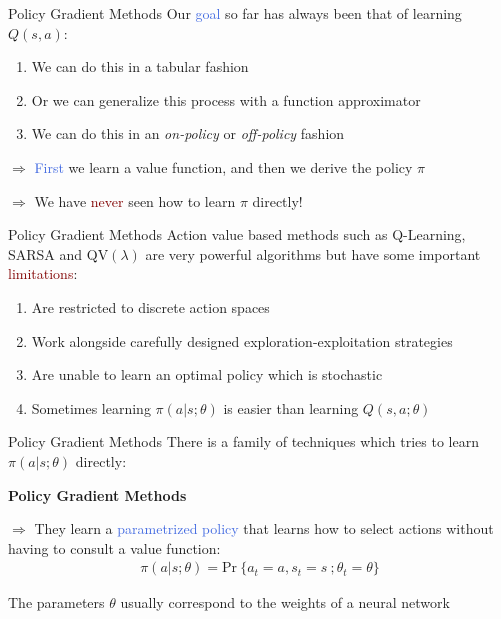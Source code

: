 \documentclass{beamer}
\begin{document}
\begin{frame}{Policy Gradient Methods}
	Our \textcolor{RoyalBlue}{goal} so far has always been that of learning $Q(s,a)$:
	\begin{enumerate}
		\item We can do this in a tabular fashion 
		\item Or we can generalize this process with a function approximator
		\item We can do this in an \textit{on-policy} or \textit{off-policy} fashion
	\end{enumerate}

	\bigskip

	$\Rightarrow$ \textcolor{RoyalBlue}{First} we learn a value function, and \textcolor{skymagenta}{then} we derive the policy $\pi$
	
	\bigskip
	
	$\Rightarrow$ We have \textcolor{Maroon}{never} seen how to learn $\pi$ directly!
	
\end{frame}


\begin{frame}{Policy Gradient Methods}
	Action value based methods such as Q-Learning, SARSA and $\text{QV}(\lambda)$ are very powerful algorithms but have some important \textcolor{Maroon}{limitations}:
	\begin{enumerate}
		\item Are restricted to discrete action spaces 
		\item Work alongside carefully designed exploration-exploitation strategies
		\item Are unable to learn an optimal policy which is stochastic 
		\item Sometimes learning $\pi(a|s;\theta)$ is easier than learning $Q(s,a;\theta)$
	\end{enumerate}

\end{frame}

\begin{frame}{Policy Gradient Methods}
	There is a family of techniques which tries to learn $\pi(a|s;\theta)$ directly:
	\begin{center}
		\textcolor{skymagenta}{\textbf{Policy Gradient Methods}}
	\end{center}

	\bigskip

	$\Rightarrow$ They learn a \textcolor{RoyalBlue}{parametrized policy} that learns how to select actions without having to consult a value function:
	\begin{align*}
		\pi(a|s;\theta)=\text{Pr}\:\{a_t = a, s_t=s\:;\theta_t=\theta\}
	\end{align*}

	\bigskip 

	The parameters $\theta$ usually correspond to the weights of a neural network

\end{frame}
\end{document}
